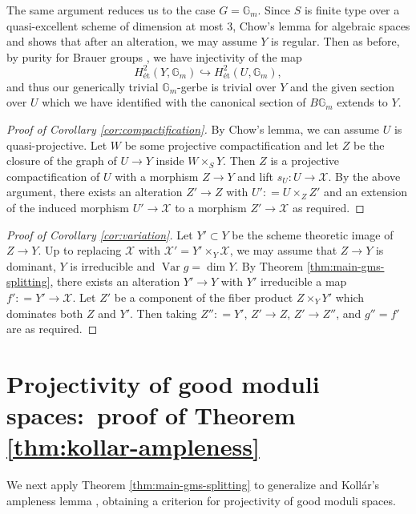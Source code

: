 \documentclass{amsart}
\theoremstyle{definition}
\newcommand{\bG}{\mathbb{G}}
\newcommand{\cX}{\mathcal{X}}
\DeclareMathOperator{\Var}{Var}
\begin{document}
	
	
	The same argument reduces us to the case $G=\bG_m$. Since $S$ is finite type over a quasi-excellent scheme of dimension at most $3$, Chow's lemma for algebraic spaces \cite[IV Theorem 3.1]{Knutson1971} and \cite[Theorem 1.2.5]{Temkin2017} shows that after an alteration, we may assume $Y$ is regular. Then as before, by purity for Brauer groups \cite[
	Theorem 3.5.4]{ColliotTheleneSkorobogatov}, we have injectivity of the map
	\[
	H^2_{\textrm{\'et}}(Y,\bG_m)\hookrightarrow H^2_{\textrm{\'et}}(U,\bG_m),
	\]
	and thus our generically trivial $\mathbb{G}_m$-gerbe is trivial over $Y$ and the given section over $U$ which we have identified with the canonical section of $B\mathbb{G}_m$ extends to $Y$. 
	
	\begin{proof}[Proof of Corollary \ref{cor:compactification}]
		
		By Chow's lemma, we can assume $U$ is quasi-projective. Let $W$ be some projective compactification and let $Z$ be the closure of the graph of $U \to Y$ inside $W \times_S Y$. Then $Z$ is a projective compactification of $U$ with a morphism $Z \to Y$ and lift $s_U : U \to \cX$. By the above argument, there exists an alteration $Z' \to Z$ with $U' \colon = U \times_Z Z'$ and an extension of the induced morphism $U' \to \cX$ to a morphism $Z' \to \cX$ as required. 
	\end{proof}
	
	\begin{proof}[Proof of Corollary \ref{cor:variation}]
		
		Let $Y' \subset Y$ be the scheme theoretic image of $Z \to Y$. Up to replacing $\cX$ with $\cX' = Y' \times_{Y}\cX$, we may assume that $Z \to Y$ is dominant, $Y$ is irreducible and $\Var g = \dim Y$. By Theorem \ref{thm:main-gms-splitting}, there exists an alteration $Y' \to Y$ with $Y'$ irreducible a map $f' \colon= Y' \to \cX$. Let $Z'$ be a component of the fiber product $Z \times_Y Y'$ which dominates both $Z$ and $Y'$. Then taking $Z'' \colon = Y'$, $Z' \to Z$, $Z' \to Z''$, and $g'' = f'$ are as required. 
		
	\end{proof}
	
	\section{Projectivity of good moduli spaces:~proof of Theorem \ref{thm:kollar-ampleness}}
	
	We next apply Theorem \ref{thm:main-gms-splitting} to generalize \cite[Theorem 4.5]{KovacsPatakfalvi2017} and Koll\'ar's ampleness lemma \cite[Lemma 3.9]{KollarAmpleness}, obtaining a criterion for projectivity of good moduli spaces.
	
\end{document}
